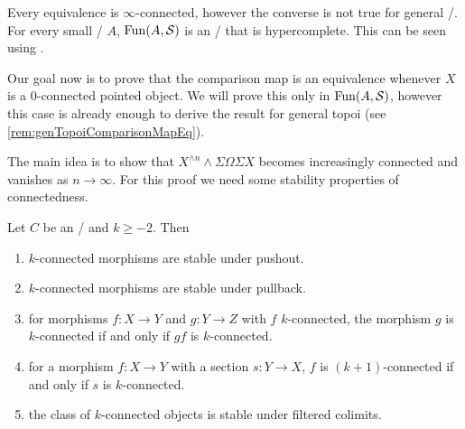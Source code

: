 \begin{remark}
    Every equivalence is $\infty$-connected, however the converse is not true for general \inftytops/.
    For every small \inftycat/ $A$, $\operatorname{Fun}(A,\mathcal{S})$ is an \inftytop/ that is hypercomplete.
    This can be seen using \cite[Remark 6.5.4.7]{HTT}.
\end{remark}
Our goal now is to prove that the comparison map is an equivalence whenever $X$ is a $0$-connected pointed object.
We will prove this only in $\operatorname{Fun}(A,\mathcal{S})$, however this case is already enough to derive the result for general topoi (see \cref{rem:genTopoiComparisonMapEq}).

The main idea is to show that $X^{\wedge n}\wedge\Sigma\Omega\Sigma X$ becomes increasingly connected and vanishes as $n\to\infty$.
For this proof we need some stability properties of connectedness.
\begin{prop}\label{prop:conn}
    Let $C$ be an \inftytop/ and $k\geq -2$.
    Then
    \begin{enumerate}[label={(\roman*)}]
        \item $k$-connected morphisms are stable under pushout. \label{prop:connStableUnderPo}
        \item $k$-connected morphisms are stable under pullback.\label{prop:connStableUnderPb}
        \item for morphisms $f\colon X\to Y$ and $g\colon Y\to Z$ with $f$ $k$-connected, the morphism $g$ is $k$-connected if and only if $gf$ is $k$-connected. \label{prop:connRightCancel}
        \item for a morphism $f\colon X\to Y$ with a section $s\colon Y\to X$, $f$ is $(k+1)$-connected if and only if $s$ is $k$-connected. \label{prop:connSection}
        \item the class of $k$-connected objects is stable under filtered colimits. \label{prop:connStableFilteredColim}
    \end{enumerate}
    \begin{reference}
        \cite[Proposition 4.10]{splittings_21}
    \end{reference}
\end{prop}
